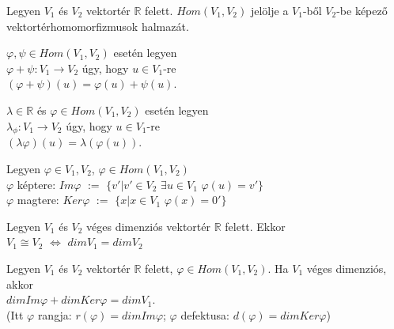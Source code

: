 	\begin{frame}
		\begin{tcolorbox}[title={Def.: Vektortérhomomorfizmusok halmaza}]
 			Legyen $V_1$ és $V_2$ vektortér $\mathbb{R}$ felett. $Hom(V_1, V_2)$ jelölje a $V_1$-ből $V_2$-be képező vektortérhomomorfizmusok halmazát.\\
 			\mmedskip
 			
			$\varphi, \psi \in Hom(V_1, V_2)$ esetén legyen\\
			$\varphi + \psi : V_1 \rightarrow V_2$ úgy, hogy $u \in V_1$-re\\
			$(\varphi + \psi)(u) = \varphi(u) + \psi(u)$. \\
			\mmedskip
						
			${\lambda} \in \mathbb{R}$ és $\varphi \in Hom(V_1, V_2)$ esetén legyen\\
			${\lambda}_{\phi} : V_1 \rightarrow V_2$ úgy, hogy $u \in V_1$-re\\
			$({\lambda}\varphi)(u) = {\lambda}(\varphi(u))$.
		\end{tcolorbox}	
		
		\begin{tcolorbox}[title={Def.: Képtér, magtér}]
 			 Legyen $\varphi \in V_1, V_2$, $\varphi \in Hom(V_1, V_2)$\\
 			 
 			 $\varphi$ képtere: $Im \varphi$ $:=$ $\{v' | v' \in V_2$ ${\exists}u \in V_1$ $\varphi(u) = v'\}$\\
 			 $\varphi$ magtere: $Ker \varphi$ $:=$ $\{ x | x \in V_1$ ${\varphi}(x) = 0'\}$
		\end{tcolorbox}	
	
		\begin{tcolorbox}[title={Tétel: Vektortér dimenziója}]
 			 Legyen $V_1$ és $V_2$ véges dimenziós vektortér $\mathbb{R}$ felett. Ekkor\\
 			 
 			 $V_1 \cong V_2$ $\iff$ $dim V_1 = dim V_2$
		\end{tcolorbox}	
		
		\begin{tcolorbox}[title={Tétel: Dimenzióösszefüggés}]
 			 Legyen $V_1$ és $V_2$ vektortér $\mathbb{R}$ felett, $\varphi \in Hom(V_1, V_2)$. Ha $V_1$ véges dimenziós, akkor\\
 			 
 			 $dim Im \varphi + dim Ker \varphi = dim V_1$.\\
			 (Itt $\varphi$ rangja: $r(\varphi) = dim Im \varphi$; $\varphi$ defektusa: $d(\varphi) = dim Ker \varphi$)
		\end{tcolorbox}	
		

\end{frame}
